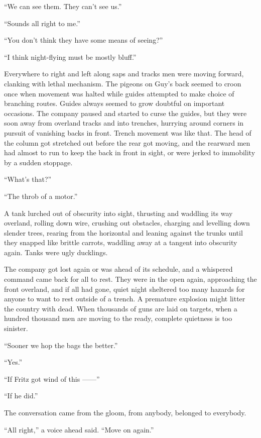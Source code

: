 ``We can see them. They can't see us.''

``Sounds all right to me.''

``You don't think they have some means of seeing?''

``I think night-flying must be mostly bluff.''

Everywhere to right and left along saps and tracks men were moving forward, clanking with lethal mechanism. The pigeons on Guy's back seemed to croon once when movement was halted while guides attempted to make choice of branching routes. Guides always seemed to grow doubtful on important occasions. The company paused and started to curse the guides, but they were soon away from overland tracks and into trenches, hurrying around corners in pursuit of vanishing backs in front. Trench movement was like that. The head of the column got stretched out before the rear got moving, and the rearward men had almost to run to keep the back in front in sight, or were jerked to immobility by a sudden stoppage.

``What's that?''

``The throb of a motor.''

A tank lurched out of obscurity into sight, thrusting and waddling its way overland, rolling down wire, crushing out obstacles, charging and levelling down slender trees, rearing from the horizontal and leaning against the trunks until they snapped like brittle carrots, waddling away at a tangent into obscurity again. Tanks were ugly ducklings.

The company got lost again or was ahead of its schedule, and a whispered command came back for all to rest. They were in the open again, approaching the front overland, and if all had gone, quiet night sheltered too many hazards for anyone to want to rest outside of a trench. A premature explosion might litter the country with dead. When thousands of guns are laid on targets, when a hundred thousand men are moving to the ready, complete quietness is too sinister.

``Sooner we hop the bags the better.''

``Yes.''

``If Fritz got wind of this ------''

``If he did.''

The conversation came from the gloom, from anybody, belonged to everybody.

``All right,'' a voice ahead said. ``Move on again.''
